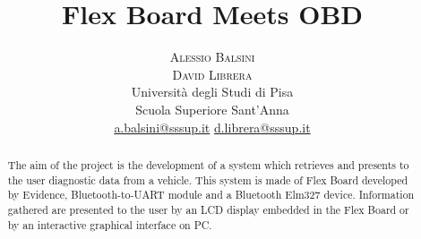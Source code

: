 \documentclass[twoside]{article}
\title{\vspace{-15mm}\fontsize{24pt}{10pt}\selectfont\textbf{Flex Board Meets OBD}} %
\author{
\large
\textsc{Alessio Balsini}\\[2mm] %
\textsc{David Librera}\\[2mm] %
\normalsize Universit\`a degli Studi di Pisa\\ %
\normalsize Scuola Superiore Sant'Anna\\ %
\normalsize \href{mailto:a.balsini@sssup.it}{a.balsini@sssup.it} %
\normalsize \href{mailto:d.librera@sssup.it}{d.librera@sssup.it} %
\vspace{-5mm}
}
\date{}
\begin{document}
\maketitle %

\thispagestyle{fancy} %


\begin{abstract}

\noindent The aim of the project is the development of a system which retrieves and presents to the user diagnostic data from a vehicle. This system is made of Flex Board developed by Evidence, Bluetooth-to-UART module and a Bluetooth Elm327 device. Information gathered are presented to the user by an LCD display embedded in the Flex Board or by an interactive graphical interface on PC.

\end{abstract}

\end{document}
